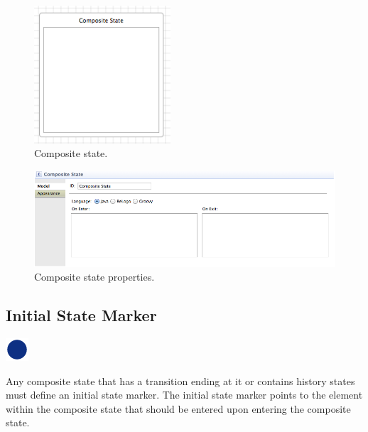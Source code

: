 \documentclass[11pt]{amsart}
\begin{document}
\begin{figure}
\begin{center}
\vspace{.2in}
\centerline {
\includegraphics[width=2in]{StatechartsImages/CompositeState.png}
}
\caption{Composite state.}
\label{fig:compositeState}
\end{center}
\end{figure}

\begin{figure}
\begin{center}
\vspace{.2in}
\centerline {
\includegraphics[width=5in]{StatechartsImages/CompositeStateProperties.png}
}
\caption{Composite state properties.}
\label{fig:compositeStateProperties}
\end{center}
\end{figure}

\clearpage

\subsection{Initial State Marker}
\label{sec:initialStateMarker}
\includegraphics[height=.2in]{StatechartsImages/Initial-State-32.png}

Any composite state that has a transition ending at it or contains history states must define an initial state marker. The initial state marker points to the element within the composite state that should be entered upon entering the composite state.
\end{document}
